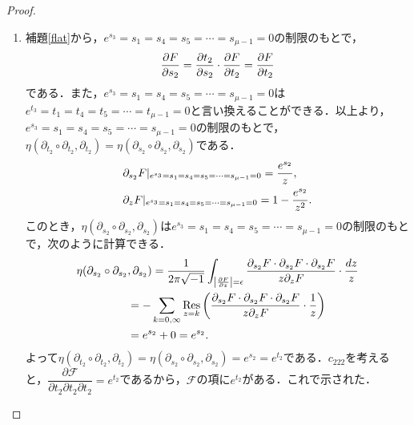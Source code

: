 \documentclass[a4paper,11pt]{jbook}
\theoremstyle{plain}
\theoremstyle{definition}
\theoremstyle{remark}
\theoremstyle{proof}
\numberwithin{equation}{section}
\def\F{{\mathcal F}}
\def\p{{\partial }}
\def\p{\partial }
\newcommand{\Res}{\mathop{\rm Res}}
\begin{document}
\begin{proof}
\begin{enumerate}
	\item\label{p1} 補題\ref{flat}から，$e^{s_3}=s_1=s_4=s_5=\cdots=s_{\mu-1}=0$の制限のもとで，
\begin{align}
	\frac{\p F}{\p s_2} = \frac{\p t_2}{\p s_2} \cdot \frac{\p F}{\p t_2} = \frac{\p F}{\p t_2} \notag
\end{align}
である．また，$e^{s_3}=s_1=s_4=s_5=\cdots=s_{\mu-1}=0$は$e^{t_3}=t_1=t_4=t_5=\cdots=t_{\mu-1}=0$と言い換えることができる．以上より，$e^{s_3}=s_1=s_4=s_5=\cdots=s_{\mu-1}=0$の制限のもとで，$\eta(\p_{t_2} \circ \p_{t_2}, \p_{t_2})=\eta(\p_{s_2}\circ\p_{s_2}, \p_{s_2})$である．
\begin{align}
&\p_{s_2}F|_{e^{s_3}=s_1=s_4=s_5=\cdots=s_{\mu-1}=0}=\dfrac{e^{s_2}}{z}, \notag \\
&\p_{z}F|_{e^{s_3}=s_1=s_4=s_5=\cdots=s_{\mu-1}=0}=1-\dfrac{e^{s_2}}{z^2}. \notag
\end{align}
このとき，$\eta(\p_{s_2}\circ\p_{s_2}, \p_{s_2})$は$e^{s_3}=s_1=s_4=s_5=\cdots=s_{\mu-1}=0$の制限のもとで，次のように計算できる．
\begin{align}
	\eta(\p_{s_2}\circ\p_{s_2}&, \p_{s_2}) = \dfrac{1}{2\pi\sqrt{-1}}\int_{\left|\frac{\partial F}{\partial z}\right|=\epsilon}\dfrac{\partial_{s_2}F\cdot\partial_{s_2}F\cdot\partial_{s_2}F}{z\partial_zF}\cdot\dfrac{dz}{z} \notag \\
&= -\sum_{k=0, \infty}\Res_{z=k} \left(\dfrac{\partial_{s_2}F\cdot\partial_{s_2}F\cdot\partial_{s_2}F}{z\partial_zF}\cdot\dfrac{1}{z}\right) \notag \\
&= e^{s_2} + 0 \notag 
= e^{s_2}.
\end{align}
よって$\eta(\p_{t_2} \circ \p_{t_2}, \p_{t_2})=\eta(\p_{s_2}\circ\p_{s_2}, \p_{s_2})=e^{s_2}=e^{t_2}$である．$c_{222}$を考えると，$\dfrac{\p \F}{\p t_2\p t_2\p t_2} = e^{t_2}$であるから，$\F$の項に$e^{t_2}$がある．これで示された．


\end{enumerate}
\end{proof}
\end{document}
